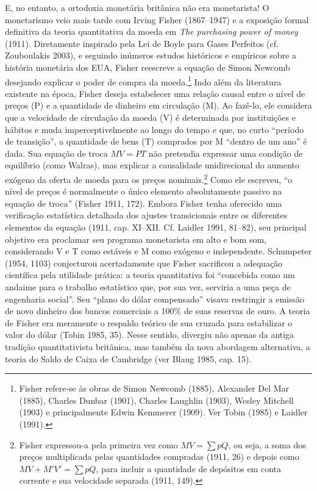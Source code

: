 \documentclass[12pt]{article}
\begin{document}
E, no entanto, a ortodoxia monetária britânica não era monetarista! O monetarismo veio mais tarde com Irving Fisher (1867–1947) e a exposição formal definitiva da teoria quantitativa da moeda em \textit{The purchasing power of money} (1911). Diretamente inspirado pela Lei de Boyle para Gases Perfeitos (cf. Zouboulakis 2003), e seguindo inúmeros estudos históricos e empíricos sobre a história monetária dos EUA, Fisher reescreve a equação de Simon Newcomb desejando explicar o poder de compra da moeda.\footnote{Fisher refere-se às obras de Simon Newcomb (1885), Alexander Del Mar (1885), Charles Dunbar (1901), Charles Laughlin (1903), Wesley Mitchell (1903) e principalmente Edwin Kemmerer (1909). Ver Tobin (1985) e Laidler (1991).} Indo além da literatura existente na época, Fisher deseja estabelecer uma relação causal entre o nível de preços (P) e a quantidade de dinheiro em circulação (M). Ao fazê-lo, ele considera que a velocidade de circulação da moeda (V) é determinada por instituições e hábitos e muda imperceptivelmente ao longo do tempo e que, no curto “período de transição”, a quantidade de bens (T) comprados por M “dentro de um ano” é dada. Sua equação de troca $MV = PT$ não pretendia expressar uma condição de equilíbrio (como Walras), mas explicar a causalidade unidirecional do aumento exógeno da oferta de moeda para os preços nominais.\footnote{Fisher expressou-a pela primeira vez como $MV = \sum pQ$, ou seja, a soma dos preços multiplicada pelas quantidades compradas (1911, 26) e depois como $MV + M'V' = \sum pQ$, para incluir a quantidade de depósitos em conta corrente e sua velocidade separada (1911, 149).} Como ele escreveu, “o nível de preços é normalmente o único elemento absolutamente passivo na equação de troca” (Fisher 1911, 172). Embora Fisher tenha oferecido uma verificação estatística detalhada dos ajustes transicionais entre os diferentes elementos da equação (1911, cap. XI–XII. Cf. Laidler 1991, 81–82), seu principal objetivo era proclamar seu programa monetarista em alto e bom som, considerando V e T como estáveis e M como exógeno e independente. Schumpeter (1954, 1103) conjecturou acertadamente que Fisher sacrificou a adequação científica pela utilidade prática: a teoria quantitativa foi “concebida como um andaime para o trabalho estatístico que, por sua vez, serviria a uma peça de engenharia social”. Seu “plano do dólar compensado” visava restringir a emissão de novo dinheiro dos bancos comerciais a 100\% de suas reservas de ouro. A teoria de Fisher era meramente o respaldo teórico de sua cruzada para estabilizar o valor do dólar (Tobin 1985, 35). Nesse sentido, divergiu não apenas da antiga tradição quantitativista britânica, mas também da nova abordagem alternativa, a teoria do Saldo de Caixa de Cambridge (ver Blaug 1985, cap. 15).
\end{document}
